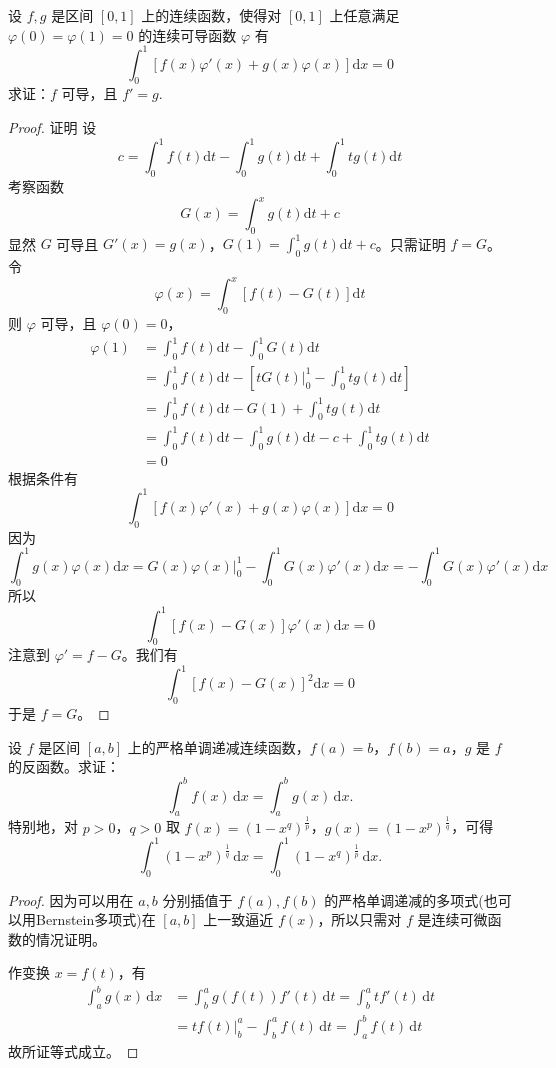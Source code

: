 \documentclass[../../main.tex]{subfiles}
\begin{document}
\begin{example}
设 \( f,g \) 是区间 \([0,1]\) 上的连续函数，使得对 \([0,1]\) 上任意满足 \( \varphi(0) = \varphi(1) = 0 \) 的连续可导函数 \( \varphi \) 有
\[
\int_{0}^{1} \left[ f(x)\varphi'(x) + g(x)\varphi(x) \right] \mathrm{d}x = 0
\]
求证：\( f \) 可导，且 \( f' = g \).
\end{example}
\begin{proof}
证明 设
\[
c = \int_{0}^{1} f(t)\mathrm{d}t - \int_{0}^{1} g(t)\mathrm{d}t + \int_{0}^{1} tg(t)\mathrm{d}t
\]
考察函数
\[
G(x) = \int_{0}^{x} g(t)\mathrm{d}t + c
\]
显然 \( G \) 可导且 \( G'(x) = g(x) \)，\( G(1) = \int_{0}^{1} g(t)\mathrm{d}t + c \)。只需证明 \( f = G \)。令
\[
\varphi(x) = \int_{0}^{x} \left[ f(t) - G(t) \right] \mathrm{d}t
\]
则 \( \varphi \) 可导，且 \( \varphi(0) = 0 \)，
\begin{align*}
\varphi(1) &= \int_{0}^{1} f(t)\mathrm{d}t - \int_{0}^{1} G(t)\mathrm{d}t \\
&= \int_{0}^{1} f(t)\mathrm{d}t - \left[ tG(t)\big|_{0}^{1} - \int_{0}^{1} tg(t)\mathrm{d}t \right] \\
&= \int_{0}^{1} f(t)\mathrm{d}t - G(1) + \int_{0}^{1} tg(t)\mathrm{d}t \\
&= \int_{0}^{1} f(t)\mathrm{d}t - \int_{0}^{1} g(t)\mathrm{d}t - c + \int_{0}^{1} tg(t)\mathrm{d}t \\
&= 0
\end{align*}
根据条件有
\[
\int_{0}^{1} \left[ f(x)\varphi'(x) + g(x)\varphi(x) \right] \mathrm{d}x = 0
\]
因为
\[
\int_{0}^{1} g(x)\varphi(x)\mathrm{d}x = G(x)\varphi(x)\big|_{0}^{1} - \int_{0}^{1} G(x)\varphi'(x)\mathrm{d}x = -\int_{0}^{1} G(x)\varphi'(x)\mathrm{d}x
\]
所以
\[
\int_{0}^{1} \left[ f(x) - G(x) \right] \varphi'(x)\mathrm{d}x = 0
\]
注意到 \( \varphi' = f - G \)。我们有
\[
\int_{0}^{1} \left[ f(x) - G(x) \right]^{2} \mathrm{d}x = 0
\]
于是 \( f = G \)。
\end{proof}

\begin{proposition}
设 \( f \) 是区间 \([a,b]\) 上的严格单调递减连续函数，\( f(a) = b \)，\( f(b) = a \)，\( g \) 是 \( f \) 的反函数。求证：
\[
\int_{a}^{b} f(x) \, \mathrm{d}x = \int_{a}^{b} g(x) \, \mathrm{d}x.
\]
特别地，对 \( p > 0 \)，\( q > 0 \) 取 \( f(x) = (1 - x^{q})^{\frac{1}{p}} \)，\( g(x) = (1 - x^{p})^{\frac{1}{q}} \)，可得
\[
\int_{0}^{1} (1 - x^{p})^{\frac{1}{q}} \, \mathrm{d}x = \int_{0}^{1} (1 - x^{q})^{\frac{1}{p}} \, \mathrm{d}x.
\]
\end{proposition}
\begin{proof}
因为可以用在 \( a,b \) 分别插值于 \( f(a),f(b) \) 的严格单调递减的多项式(也可以用Bernstein多项式)在 \([a,b]\) 上一致逼近 \( f(x) \)，所以只需对 \( f \) 是连续可微函数的情况证明。

作变换 \( x = f(t) \)，有
\begin{align*}
\int_{a}^{b} g(x) \, \mathrm{d}x &= \int_{b}^{a} g(f(t))f'(t) \, \mathrm{d}t = \int_{b}^{a} t f'(t) \, \mathrm{d}t \\
&= \left. t f(t) \right|_{b}^{a} - \int_{b}^{a} f(t) \, \mathrm{d}t = \int_{a}^{b} f(t) \, \mathrm{d}t
\end{align*}
故所证等式成立。
\end{proof}
\end{document}
